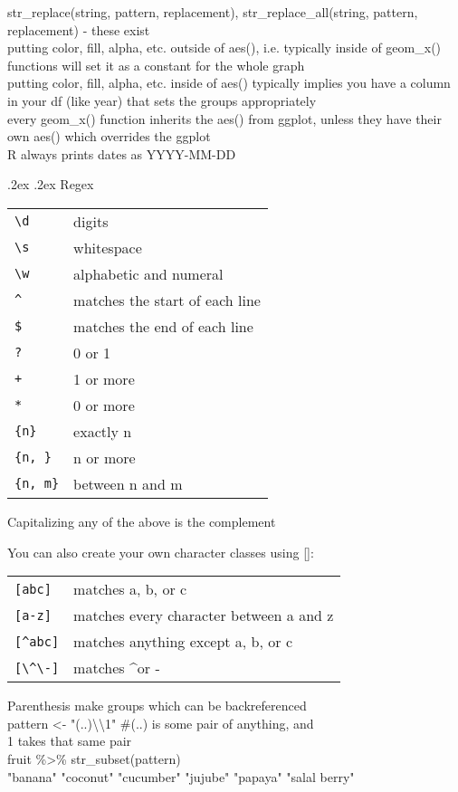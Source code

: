 \documentclass[10pt,landscape]{article}
\makeatletter
\renewcommand{\subsection}{\@startsection{subsection}{2}{0mm}%
                                {.2ex}%
                                {.2ex}%
                                {\normalfont\normalsize\bfseries}}
\makeatother
\begin{document}
\begin{multicols}{3}
str\_replace(string, pattern, replacement), str\_replace\_all(string, pattern, replacement) - these exist \\
putting color, fill, alpha, etc. outside of aes(), i.e. typically inside of geom\_x() functions will set it as a constant for the whole graph \\
putting color, fill, alpha, etc. inside of aes() typically implies you have a column in your df (like year) that sets the groups appropriately \\
every geom\_x() function inherits the aes() from ggplot, unless they have their own aes() which overrides the ggplot \\
R always prints dates as YYYY-MM-DD

\subsection{Regex}
\begin{tabular}{@{}p{\the\MyLen}%
                @{}p{\linewidth-\the\MyLen}@{}}
\verb!\d! & digits \\
\verb!\s!  & whitespace \\
\verb!\w!   & alphabetic and numeral \\
\verb!^! & matches the start of each line \\
\verb!$! & matches the end of each line \\
\verb!?! & 0 or 1 \\
\verb!+! & 1 or more \\
\verb!*! & 0 or more \\
\verb!{n}! & exactly n \\
\verb!{n, }! & n or more \\
\verb!{n, m}! & between n and m \\

\end{tabular}
Capitalizing any of the above is the complement 

You can also create your own character classes using []:
\begin{tabular}{@{}p{\the\MyLen}%
        @{}p{\linewidth-\the\MyLen}@{}}
\verb![abc]! & matches a, b, or c \\
\verb![a-z]!  & matches every character between a and z \\
\verb![^abc]!   & matches anything except a, b, or c \\
\verb![\^\-]!   & matches \textasciicircum or - \\
\end{tabular}
Parenthesis make groups which can be backreferenced \\
pattern <- "(..)\textbackslash\textbackslash1" \#(..) is some pair of anything, and \\1 takes that same pair  \\
fruit \%>\% str\_subset(pattern) \\
"banana"      "coconut"     "cucumber"    "jujube"    "papaya" "salal berry"

\end{multicols}
\end{document}
